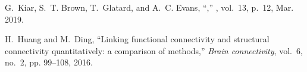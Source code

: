 \documentclass[10pt,letterpaper]{article}
\begin{document}
\begin{thebibliography}{10}
G.~Kiar, S.~T. Brown, T.~Glatard, and A.~C. Evans, ``,''
  \emph{}, vol.~13, p.~12, Mar.
  2019.

H.~Huang and M.~Ding, ``Linking functional connectivity and structural
  connectivity quantitatively: a comparison of methods,'' \emph{Brain
  connectivity}, vol.~6, no.~2, pp. 99--108, 2016.

\end{thebibliography}
\end{document}
